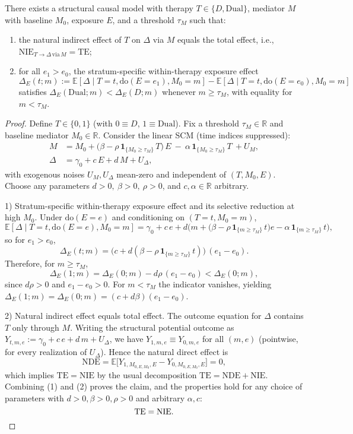 ﻿\begin{theorem}\label{thm-threshold-mediated-effect}
There exists a structural causal model with therapy \(T\in\{D,\mathrm{Dual}\}\), mediator \(M\) with baseline \(M_0\), exposure \(E\), and a threshold \(\tau_M\) such that:
\begin{enumerate}[label=(i)]
  \item the natural indirect effect of \(T\) on \(\Delta\) via \(M\) equals the total effect, i.e., \(\mathrm{NIE}_{T\to\Delta\,\mathrm{via}\,M}=\mathrm{TE}\);
  \item for all \(e_1>e_0\), the stratum-specific within-therapy exposure effect
  \[
    \Delta_E(t;m):=\mathbb E[\Delta\mid T{=}t,\mathrm{do}(E{=}e_1),M_0{=}m]-\mathbb E[\Delta\mid T{=}t,\mathrm{do}(E{=}e_0),M_0{=}m]
  \]
  satisfies \(\Delta_E(\mathrm{Dual};m)<\Delta_E(D;m)\) whenever \(m\ge\tau_M\), with equality for \(m<\tau_M\).
\end{enumerate}
\end{theorem}

\begin{proof}
Define \(T\in\{0,1\}\) (with \(0\equiv D\), \(1\equiv \mathrm{Dual}\)). Fix a threshold \(\tau_M\in\mathbb R\) and baseline mediator \(M_0\in\mathbb R\). Consider the linear SCM (time indices suppressed):
\[
\begin{aligned}
M&=M_0+\big(\beta-\rho\,\mathbf 1_{\{M_0\ge\tau_M\}}\,T\big)\,E\ -\ \alpha\,\mathbf 1_{\{M_0\ge\tau_M\}}\,T\ +U_M,\\
\Delta&=\gamma_0+c\,E+d\,M+U_\Delta,
\end{aligned}
\]
with exogenous noises \(U_M,U_\Delta\) mean-zero and independent of \((T,M_0,E)\). Choose any parameters \(d>0,\ \beta>0,\ \rho>0\), and \(c,\alpha\in\mathbb R\) arbitrary.

1) Stratum-specific within-therapy exposure effect and its selective reduction at high \(M_0\). Under \(\mathrm{do}(E{=}e)\) and conditioning on \((T{=}t,M_0{=}m)\),
\[
\mathbb E[\Delta\mid T{=}t,\mathrm{do}(E{=}e),M_0{=}m]=\gamma_0+c\,e+d\Big(m+\big(\beta-\rho\,\mathbf 1_{\{m\ge\tau_M\}}\,t\big)e-\alpha\,\mathbf 1_{\{m\ge\tau_M\}}\,t\Big),
\]
so for \(e_1>e_0\),
\[
\Delta_E(t;m)=\big(c+d(\beta-\rho\,\mathbf 1_{\{m\ge\tau_M\}}\,t)\big)\,(e_1-e_0).
\]
Therefore, for \(m\ge\tau_M\),
\[
\Delta_E(1;m)=\Delta_E(0;m)-d\rho\,(e_1-e_0)<\Delta_E(0;m),
\]
since \(d\rho>0\) and \(e_1-e_0>0\). For \(m<\tau_M\) the indicator vanishes, yielding \(\Delta_E(1;m)=\Delta_E(0;m)=(c+d\beta)(e_1-e_0)\).

2) Natural indirect effect equals total effect. The outcome equation for \(\Delta\) contains \(T\) only through \(M\). Writing the structural potential outcome as \(Y_{t,m,e}:=\gamma_0+c\,e+d\,m+U_\Delta\), we have \(Y_{1,m,e}\equiv Y_{0,m,e}\) for all \((m,e)\) (pointwise, for every realization of \(U_\Delta\)). Hence the natural direct effect is
\[
\mathrm{NDE}=\mathbb E\big[Y_{1,M_{0,E,M_0},E}-Y_{0,M_{0,E,M_0},E}\big]=0,
\]
which implies \(\mathrm{TE}=\mathrm{NIE}\) by the usual decomposition \(\mathrm{TE}=\mathrm{NDE}+\mathrm{NIE}\). Combining (1) and (2) proves the claim, and the properties hold for any choice of parameters with \(d>0,\beta>0,\rho>0\) and arbitrary \(\alpha,c\):
\[
\mathrm{TE}=\mathrm{NIE}.\qedhere
\]
\end{proof}
